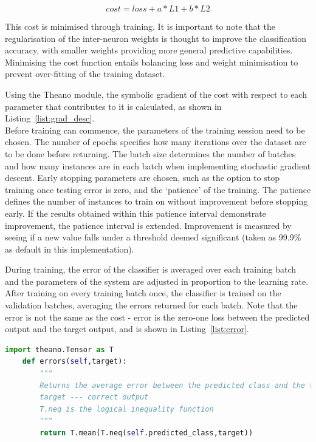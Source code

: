 \[cost = loss + a*L1 + b*L2\]

This cost is minimised through training. It is important to note that the regularisation of the inter-neuron weights is thought to improve the classification accuracy, with smaller weights providing more general predictive capabilities. Minimising the cost function entails balancing loss and weight minimisation to prevent over-fitting of the training dataset.

Using the Theano module, the symbolic gradient of the cost with respect to each parameter that contributes to it is calculated, as shown in Listing~\ref{list:grad_desc}. \\

Before training can commence, the parameters of the training session need to be chosen. The number of epochs specifies how many iterations over the dataset are to be done before returning. The batch size determines the number of batches and how many instances are in each batch when implementing stochastic gradient descent. Early stopping parameters are chosen, such as the option to stop training once testing error is zero, and the `patience' of the training. The patience defines the number of instances to train on without improvement before stopping early. If the results obtained within this patience interval demonstrate improvement, the patience interval is extended. Improvement is measured by seeing if a new value falls under a threshold deemed significant (taken as 99.9\% as default in this implementation).

During training, the error of the classifier is averaged over each training batch and the parameters of the system are adjusted in proportion to the learning rate. After training on every training batch once, the classifier is trained on the validation batches, averaging the errors returned for each batch. Note that the error is not the same as the cost - error is the zero-one loss between the predicted output and the target output, and is shown in Listing~\ref{list:error}.

\begin{lstlisting}[language=Python, caption=Calculating Zero-one Error, captionpos=b, label={list:error}]
    import theano.Tensor as T
    def errors(self,target):
		"""
		Returns the average error between the predicted class and the target class
		target --- correct output
		T.neq is the logical inequality function
		"""
		return T.mean(T.neq(self.predicted_class,target))        
\end{lstlisting}

